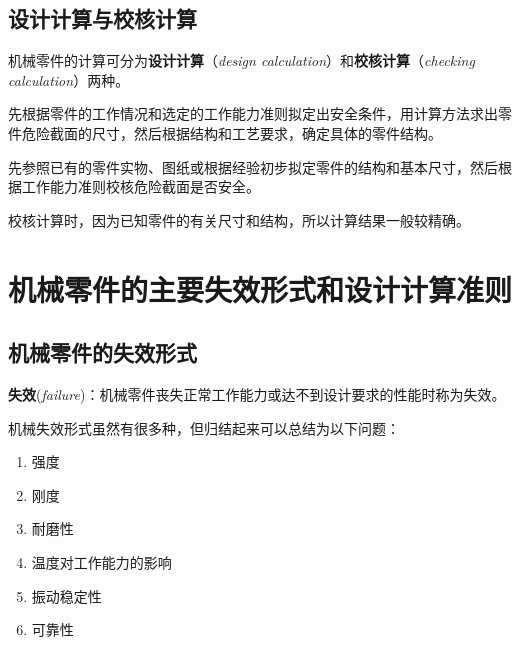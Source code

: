 \subsection{设计计算与校核计算}

\begin{sloppypar}
机械零件的计算可分为\textbf{设计计算}（\emph{design calculation}）和\textbf{校核计算}（\emph{checking calculation}）两种。
\end{sloppypar}

\begin{definition}[设计计算]
\label{def:设计计算}
先根据零件的工作情况和选定的工作能力准则拟定出安全条件，用计算方法求出零件危险截面的尺寸，然后根据结构和工艺要求，确定具体的零件结构。
\end{definition}

\begin{definition}[校核计算]
\label{def:校核计算}
先参照已有的零件实物、图纸或根据经验初步拟定零件的结构和基本尺寸，然后根据工作能力准则校核危险截面是否安全。
\end{definition}

\begin{note}
校核计算时，因为已知零件的有关尺寸和结构，所以计算结果一般较精确。
\end{note}

\section{机械零件的主要失效形式和设计计算准则}
\label{sec:失效形式与设计计算准则}

\subsection{机械零件的失效形式}

\begin{definition}[失效]
\label{def:失效}
\textbf{失效}(\emph{failure})：机械零件丧失正常工作能力或达不到设计要求的性能时称为失效。
\end{definition}

机械失效形式虽然有很多种，但归结起来可以总结为以下问题：

\begin{enumerate}
	\item 强度
	\item 刚度
	\item 耐磨性
	\item 温度对工作能力的影响
	\item 振动稳定性
	\item 可靠性
\end{enumerate}

